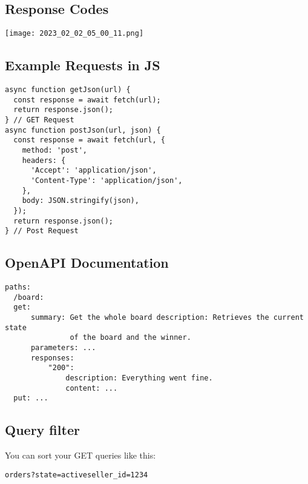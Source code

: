 \documentclass[main.tex,fontsize=6pt,paper=a4,paper=landscape,DIV=calc,]{scrartcl}
\begin{document}
\begin{multicols*}{4}
\subsection{Response Codes}
\texttt{[image: 2023\_02\_02\_05\_00\_11.png]}

\subsection{Example Requests in JS}
\vspace{-2mm}
\begin{lstlisting}
async function getJson(url) {
  const response = await fetch(url);
  return response.json();
} // GET Request
async function postJson(url, json) {
  const response = await fetch(url, {
    method: 'post',
    headers: {
      'Accept': 'application/json',
      'Content-Type': 'application/json',
    },
    body: JSON.stringify(json),
  });
  return response.json();
} // Post Request
\end{lstlisting}
\vspace{2mm}

\subsection{OpenAPI Documentation}
\vspace{-2mm}
\begin{lstlisting}
paths:
  /board:
  get:
      summary: Get the whole board description: Retrieves the current state
               of the board and the winner.
      parameters: ...
      responses:
          "200":
              description: Everything went fine.
              content: ...
  put: ...
\end{lstlisting}
\vspace{2mm}

\subsection{Query filter}  
You can sort your GET queries like this: \newline
\vspace{-2mm}
\begin{lstlisting}
orders?state=activeseller_id=1234
\end{lstlisting}
\vspace{2mm}


\end{multicols*}
\end{document}
